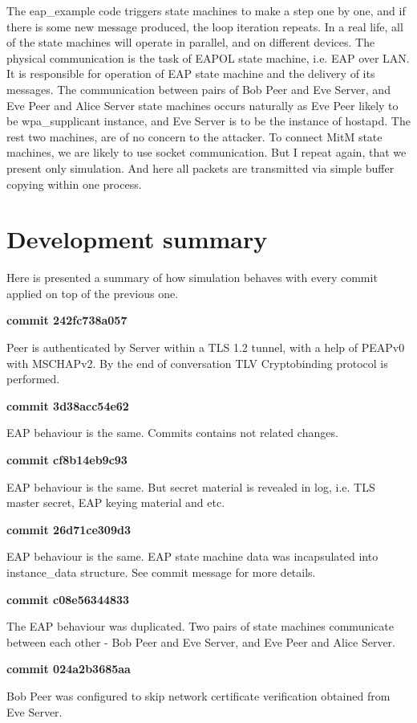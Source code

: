 \documentclass{amsart}
\begin{document}
The eap\_example code triggers state machines to make a step one by one,
and if there is some new message produced, the loop iteration repeats.
In a real life, all of the state machines will operate in parallel,
and on different devices.
The physical communication is the task of EAPOL state machine,
i.e. EAP over LAN.
It is responsible for operation of EAP state machine and the delivery
of its messages.
The communication between pairs of Bob Peer and Eve Server,
and Eve Peer and Alice Server state machines occurs naturally
as Eve Peer likely to be wpa\_supplicant instance, and Eve Server is to be the
instance of hostapd.
The rest two machines, are of no concern to the attacker.
To connect MitM state machines, we are likely to use socket communication.
But I repeat again, that we present only simulation.
And here all packets are transmitted via simple buffer copying within one process.

\section{Development summary}

Here is presented a summary of how simulation behaves
with every commit applied on top of the previous one.

\textbf{commit 242fc738a057}

Peer is authenticated by Server within a TLS 1.2 tunnel,
with a help of PEAPv0 with MSCHAPv2. By the end of conversation
TLV Cryptobinding protocol is performed.

\textbf{commit 3d38acc54e62}

EAP behaviour is the same. Commits contains not related changes.

\textbf{commit cf8b14eb9c93}

EAP behaviour is the same. But secret material is revealed in log,
i.e. TLS master secret, EAP keying material and etc.

\textbf{commit 26d71ce309d3}

EAP behaviour is the same. EAP state machine data was incapsulated
into instance\_data structure. See commit message for more details.

\textbf{commit c08e56344833}

The EAP behaviour was duplicated. Two pairs of state machines
communicate between each other - Bob Peer and Eve Server,
and Eve Peer and Alice Server.

\textbf{commit 024a2b3685aa}

Bob Peer was configured to skip network certificate verification
obtained from Eve Server.
\end{document}
